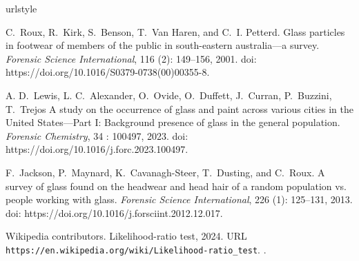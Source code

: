 \documentclass{article}\usepackage[]{graphicx}\usepackage[]{xcolor}
\begin{document}
\begin{thebibliography}{4}
\providecommand{\natexlab}[1]{#1}
\providecommand{\url}[1]{\texttt{#1}}
\expandafter\ifx\csname urlstyle\endcsname\relax
  \providecommand{\doi}[1]{doi: #1}\else
  \providecommand{\doi}{doi: \begingroup \urlstyle{rm}\Url}\fi

C.~Roux, R.~Kirk, S.~Benson, T.~{Van Haren}, and C.~I. Petterd.
\newblock Glass particles in footwear of members of the public in south-eastern
  australia---a survey.
\newblock \emph{Forensic Science International}, 116 (2):
  149--156, 2001.
\newblock \doi{https://doi.org/10.1016/S0379-0738(00)00355-8}.

A. D.~Lewis, L. C.~Alexander, O.~Ovide, O.~Duffett, J.~Curran, P.~Buzzini, T.~Trejos
\newblock A study on the occurrence of glass and paint across various cities in the
United States---Part I: Background presence of glass in the general population.
\newblock \emph{Forensic Chemistry}, 34
  : 100497, 2023.
\newblock \doi{https://doi.org/10.1016/j.forc.2023.100497}.

F.~Jackson, P.~{Maynard}, K.~Cavanagh-Steer, T.~Dusting, and C.~Roux.
\newblock A survey of glass found on the headwear and head hair of a random
  population vs. people working with glass.
\newblock \emph{Forensic Science International}, 226 (1):
  125--131, 2013.
\newblock \doi{https://doi.org/10.1016/j.forsciint.2012.12.017}.

Wikipedia contributors.
\newblock Likelihood-ratio test, 2024.
\newblock URL \url{https://en.wikipedia.org/wiki/Likelihood-ratio_test}.
.

\end{thebibliography}
\end{document}
